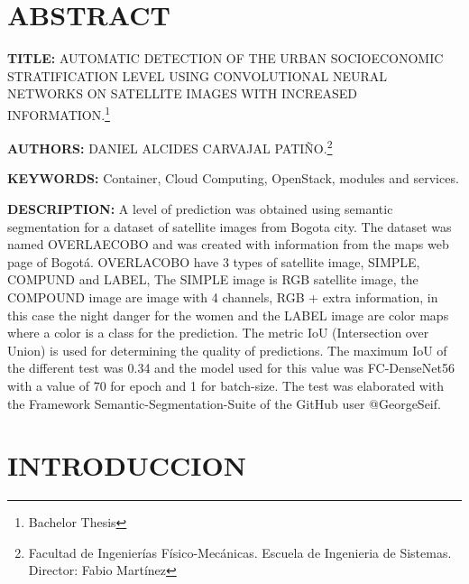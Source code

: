 \setcounter{footnote}{0}
	\newpage\chapter*{ABSTRACT}
    \textbf{TITLE:} AUTOMATIC DETECTION OF THE URBAN SOCIOECONOMIC STRATIFICATION LEVEL USING CONVOLUTIONAL NEURAL NETWORKS ON SATELLITE IMAGES WITH INCREASED INFORMATION.\footnote{Bachelor Thesis}
    
    \textbf{AUTHORS:} DANIEL ALCIDES CARVAJAL PATIÑO.\footnote{Facultad de Ingenierías Físico-Mecánicas.  Escuela de Ingenieria de Sistemas. Director: Fabio Martínez
}
    
    \textbf{KEYWORDS:} Container, Cloud Computing, OpenStack, modules and services.
    
    \textbf{DESCRIPTION:} A level of prediction was obtained using semantic segmentation for a dataset of satellite images from Bogota city.  The dataset was named OVERLAECOBO and was created with information from the maps web page of Bogotá. OVERLACOBO have 3 types of satellite image, SIMPLE, COMPUND and LABEL, The SIMPLE image is RGB satellite image,  the COMPOUND image are image with 4 channels, RGB + extra information, in this case the night danger for the women and the LABEL image are color maps where a color is a class for the prediction. The metric IoU (Intersection over Union) is used for determining the quality of predictions. The maximum IoU of the different test was 0.34 and the model used for this value was FC-DenseNet56 with a value of 70 for epoch and 1 for batch-size. The test was elaborated with the Framework Semantic-Segmentation-Suite of the GitHub user @GeorgeSeif. 
   
     \renewcommand{\thefootnote}{\arabic{footnote}}   
\newpage\chapter*{INTRODUCCION}

